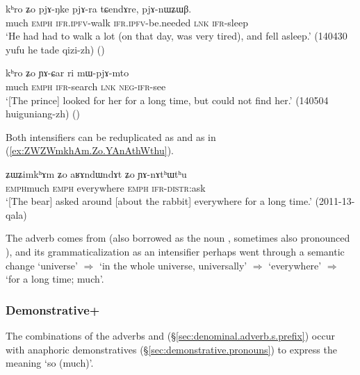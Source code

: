 \begin{exe}
\ex \label{ex:khro.Zo.pjANke}
\gll kʰro ʑo pjɤ-ŋke pjɤ-ra tɕendɤre, pjɤ-nɯʑɯβ. \\
much \textsc{emph} \textsc{ifr}.\textsc{ipfv}-walk \textsc{ifr}.\textsc{ipfv}-be.needed \textsc{lnk} \textsc{ifr}-sleep \\
\glt `He had had to walk a lot (on that day, was very tired), and fell asleep.' (140430 yufu he tade qizi-zh)
()
\end{exe}

\begin{exe}
\ex \label{ex:khro.Zo.YACar}
\gll kʰro ʑo ɲɤ-ɕar ri mɯ-pjɤ-mto \\
much \textsc{emph} \textsc{ifr}-search \textsc{lnk} \textsc{neg}-\textsc{ifr}-see \\
\glt `[The prince] looked for her for a long time, but could not find her.' (140504 huiguniang-zh)
()
\end{exe}

Both intensifiers can be reduplicated as  and  as in (\ref{ex:ZWZWmkhAm.Zo.YAnAthWthu}).

\begin{exe} 
\ex \label{ex:ZWZWmkhAm.Zo.YAnAthWthu}
\gll ʑɯ\redp{}ʑimkʰɤm ʑo aʁɤndɯndɤt ʑo ɲɤ-nɤtʰɯtʰu \\
\textsc{emph}\redp{}much \textsc{emph} everywhere \textsc{emph} \textsc{ifr}-\textsc{distr}:ask \\
\glt `[The bear] asked around [about the rabbit] everywhere for a long time.' (2011-13-qala)
\end{exe}

The adverb  comes from  (also borrowed as the noun , sometimes also pronounced ), and its grammaticalization as an intensifier perhaps went through a semantic change `universe' $\Rightarrow$ `in the whole universe, universally' $\Rightarrow$ `everywhere' $\Rightarrow$ `for a long time; much'.

\subsubsection{Demonstrative+} \label{sec:nWtshWci}
The combinations of the adverbs  and  (§\ref{sec:denominal.adverb.s.prefix}) occur with anaphoric demonstratives (§\ref{sec:demonstrative.pronouns}) to express the meaning `so (much)'.

